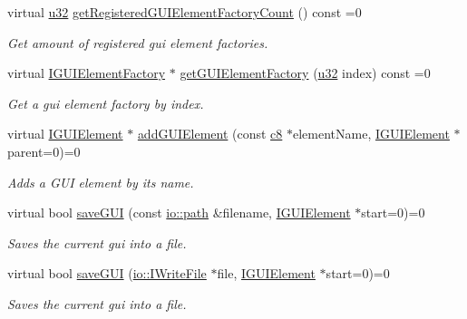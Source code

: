 \begin{DoxyCompactItemize}
virtual \hyperlink{namespaceirr_a0416a53257075833e7002efd0a18e804}{u32} \hyperlink{classirr_1_1gui_1_1IGUIEnvironment_a022dcd144b1f955180569ef2ee844561}{get\+Registered\+G\+U\+I\+Element\+Factory\+Count} () const =0
\begin{DoxyCompactList}\small\item\em Get amount of registered gui element factories. \end{DoxyCompactList}\item 
virtual \hyperlink{classirr_1_1gui_1_1IGUIElementFactory}{I\+G\+U\+I\+Element\+Factory} $\ast$ \hyperlink{classirr_1_1gui_1_1IGUIEnvironment_a3c1ec1c13e7339e2e8abb34276d6288f}{get\+G\+U\+I\+Element\+Factory} (\hyperlink{namespaceirr_a0416a53257075833e7002efd0a18e804}{u32} index) const =0
\begin{DoxyCompactList}\small\item\em Get a gui element factory by index. \end{DoxyCompactList}\item 
virtual \hyperlink{classirr_1_1gui_1_1IGUIElement}{I\+G\+U\+I\+Element} $\ast$ \hyperlink{classirr_1_1gui_1_1IGUIEnvironment_a17114e35fc67f6d54df1baebb806f3b7}{add\+G\+U\+I\+Element} (const \hyperlink{namespaceirr_a9395eaea339bcb546b319e9c96bf7410}{c8} $\ast$element\+Name, \hyperlink{classirr_1_1gui_1_1IGUIElement}{I\+G\+U\+I\+Element} $\ast$parent=0)=0
\begin{DoxyCompactList}\small\item\em Adds a G\+UI element by its name. \end{DoxyCompactList}\item 
virtual bool \hyperlink{classirr_1_1gui_1_1IGUIEnvironment_ac5e7b39ff2292983660a5e5999b240b3}{save\+G\+UI} (const \hyperlink{namespaceirr_1_1io_a6468281622ce3a1c46b72e19f32dded5}{io\+::path} \&filename, \hyperlink{classirr_1_1gui_1_1IGUIElement}{I\+G\+U\+I\+Element} $\ast$start=0)=0
\begin{DoxyCompactList}\small\item\em Saves the current gui into a file. \end{DoxyCompactList}\item 
virtual bool \hyperlink{classirr_1_1gui_1_1IGUIEnvironment_a39fdeef8455813a2be2bce9212ec758a}{save\+G\+UI} (\hyperlink{classirr_1_1io_1_1IWriteFile}{io\+::\+I\+Write\+File} $\ast$file, \hyperlink{classirr_1_1gui_1_1IGUIElement}{I\+G\+U\+I\+Element} $\ast$start=0)=0
\begin{DoxyCompactList}\small\item\em Saves the current gui into a file. \end{DoxyCompactList}\item 

\end{DoxyCompactItemize}

